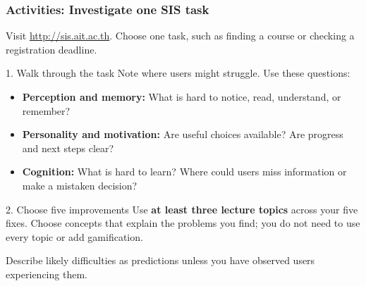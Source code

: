 \documentclass{beamer}
\begin{document}
		
		

\begin{frame}
    \frametitle{Activities: Investigate one SIS task}
    \small
    Visit \url{http://sis.ait.ac.th}. Choose one task, such as
    finding a course or checking a registration deadline.
    \begin{block}{1. Walk through the task}
    Note where users might struggle. Use these questions:
    \begin{itemize}
        \item \textbf{Perception and memory:} What is hard to notice,
        read, understand, or remember?
        \item \textbf{Personality and motivation:} Are useful choices
        available? Are progress and next steps clear?
        \item \textbf{Cognition:} What is hard to learn? Where could
        users miss information or make a mistaken decision?
    \end{itemize}
    \end{block}
    \begin{block}{2. Choose five improvements}
    Use \textbf{at least three lecture topics} across your five fixes.
    Choose concepts that explain the problems you find; you do not
    need to use every topic or add gamification.
    \end{block}
    {\footnotesize Describe likely difficulties as predictions unless you have observed users experiencing them.}
\end{frame}
\end{document}
